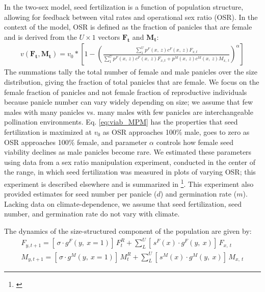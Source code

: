 \documentclass[12pt]{article}\usepackage[]{graphicx}\usepackage[dvipsnames]{xcolor}
\newcommand{\tom}[2]{{\color{red}{#1}}\footnote{\textit{\color{red}{#2}}}}
\begin{document}
In the two-sex model, seed fertilization is a function of population structure, allowing for feedback between vital rates and operational sex ratio (OSR). 
In the context of the model, OSR is defined as the fraction of panicles that are female and is derived from the $U \times 1$ vectors $\mathbf{F_{t}}$ and $\mathbf{M_{t}}$:
\begin{align}\label{eq:viab_MPM}
	v(\mathbf{F_{t}},\mathbf{M_{t}}) = v_{0} * \left[ 1 - \left( \frac{\sum_{1}^{U} p^{F}(x,\ z) c^{F}(x,\ z) F_{x,t}}{\sum_{1}^{U} p^{F}(x,\ z) c^{F}(x,\ z) F_{x,t} + p^{M}(x,\ z) c^{M}(x,\ z) M_{x,\ t}} \right) ^{\alpha}\right]
\end{align}
The summations tally the total number of female and male panicles over the size distribution, giving the fraction of total panicles that are female. 
We focus on the female fraction of panicles and not female fraction of reproductive individuals because panicle number can vary widely depending on size; we assume that few males with many panicles vs. many males with few panicles are interchangeable pollination environments. 
Eq. \ref{eq:viab_MPM} has the properties that seed fertilization is maximized at $v_{0}$ as OSR approaches 100\% male, goes to zero as OSR approaches 100\% female, and parameter $\alpha$ controls how female seed viability declines as male panicles become rare. 
We estimated these parameters using data from a sex ratio manipulation experiment, conducted in the center of the range, in which seed fertilization was measured in plots of varying OSR; this experiment is described elsewhere  \citep{compagnoni2017can} and is summarized in \tom{Supplementary Method \ref{sssec:experiment}}{I think the supplement should also include a data figure showing the fit of the model to the experimental data.}. 
This experiment also provided estimates for seed number per panicle ($d$) and germination rate ($m$). 
Lacking data on climate-dependence, we assume that seed fertilization, seed number, and germination rate do not vary with climate.  

The dynamics of the size-structured component of the population are given by:
\begin{align}\label{eq:dynamics}
F_{y,t+1} = [ \, \sigma \cdot g^{F}(y,\ x=1) ] \, F^{R}_{t} + \sum_{L}^{U} 	[ \, s^{F}(x) \cdot g^{F}(y,\ x)] \, F_{x,\ t}
\\
M_{y,t+1} = [ \, \sigma \cdot g^{M}(y,\ x=1) ] \, M^{R}_{t} + \sum_{L}^{U} 	[ \,  s^{M}(x) \cdot g^{M}(y,\ x) ] \, M_{x,\ t}
\end{align}
\end{document}
